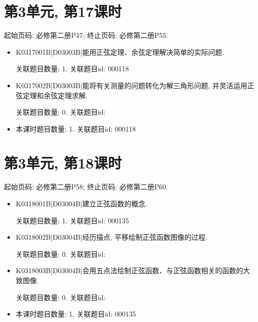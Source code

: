 \section*{第3单元, 第17课时}
起始页码: 必修第二册P47; 终止页码: 必修第二册P55.
\begin{itemize}
\item K0317001B|D03003B|能用正弦定理、余弦定理解决简单的实际问题.

关联题目数量: 1. 关联题目id: 000118

\item K0317002B|D03003B|能将有关测量的问题转化为解三角形问题, 并灵活运用正弦定理和余弦定理求解.

关联题目数量: 0. 关联题目id: 

\item 本课时题目数量: 1. 关联题目id: 000118

\end{itemize}

\section*{第3单元, 第18课时}
起始页码: 必修第二册P58; 终止页码: 必修第二册P60.
\begin{itemize}
\item K0318001B|D03004B|建立正弦函数的概念.

关联题目数量: 1. 关联题目id: 000135

\item K0318002B|D03004B|经历描点, 平移绘制正弦函数图像的过程.

关联题目数量: 0. 关联题目id: 

\item K0318003B|D03004B|会用五点法绘制正弦函数、与正弦函数相关的函数的大致图像.

关联题目数量: 0. 关联题目id: 

\item 本课时题目数量: 1. 关联题目id: 000135

\end{itemize}

